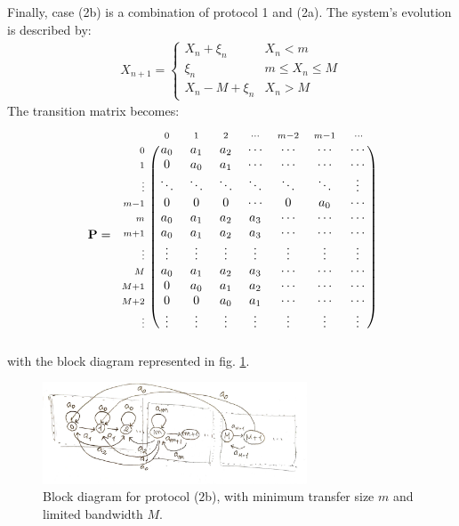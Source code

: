 \documentclass[../template.tex]{subfiles}
\begin{document}
Finally, case (2b) is a combination of protocol 1 and (2a). The system's evolution is described by:
\begin{align*}
    X_{n+1} = \begin{cases}
        X_n + \xi_n & X_n < m\\
        \xi_n & m \leq X_n \leq M\\
        X_n - M + \xi_n & X_n > M
    \end{cases}
\end{align*}
The transition matrix becomes:
\begin{align*}
    \textbf{P} = \begin{blockarray}{*{7}{c} l}
        \begin{block}{l*{7}{>{\scriptstyle}c<{}}}
            & 0 & 1 & 2 & \cdots & m-2 & m-1 & \cdots \\
          \end{block}
          \begin{block}{>{\scriptstyle}r<{}(*{7}{c})}
            0 & a_0  & a_1  & a_2  & \cdots & \cdots & \cdots & \cdots \\ 
            1 & 0 & a_0 & a_1 & \cdots & \cdots & \cdots & \cdots \\ 
            \vdots & \ddots & \ddots & \ddots & \ddots & \ddots & \ddots & \vdots \\ 
            m-1 & 0 & 0 & 0 & \cdots & 0 & a_0 & \cdots \\ 
            m & a_0 & a_1 & a_2 & a_3 & \cdots & \cdots & \cdots \\ 
            m+1 & a_0 & a_1 & a_2 & a_3 & \cdots & \cdots & \cdots \\
            \vdots & \vdots & \vdots & \vdots & \vdots & \vdots & \vdots & \vdots \\
            M & a_0 & a_1 & a_2 & a_3 & \cdots & \cdots & \cdots\\
            M+1 & 0 & a_0 & a_1 & a_2 & \cdots & \cdots & \cdots \\
            M+2 & 0 & 0 & a_0 & a_1 & \cdots & \cdots & \cdots\\
            \vdots & \vdots & \vdots & \vdots & \vdots & \vdots & \vdots & \vdots \\
        \end{block} 
    \end{blockarray} 
\end{align*}
with the block diagram represented in fig. \ref{fig:block3}.

\begin{figure}[htp]
    \centering
    \includegraphics[width=0.7\textwidth]{block3.jpeg}
    \caption{Block diagram for protocol ($2$b), with minimum transfer size $m$ and limited bandwidth $M$.\label{fig:block3}} 
\end{figure}
\end{document}
